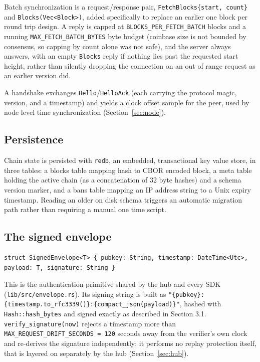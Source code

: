 \documentclass[11pt]{article}
\newcommand{\code}[1]{\texttt{#1}}
\begin{document}
Batch synchronization is a request/response pair, \code{FetchBlocks\{start, count\}} and \code{Blocks(Vec<Block>)}, added specifically to replace an earlier one block per round trip design. A reply is capped at \code{BLOCKS_PER_FETCH_BATCH} blocks and a running \code{MAX_FETCH_BATCH_BYTES} byte budget (coinbase size is not bounded by consensus, so capping by count alone was not safe), and the server always answers, with an empty \code{Blocks} reply if nothing lies past the requested start height, rather than silently dropping the connection on an out of range request as an earlier version did.

A handshake exchanges \code{Hello}/\code{HelloAck} (each carrying the protocol magic, version, and a timestamp) and yields a clock offset sample for the peer, used by node level time synchronization (Section~\ref{sec:node}).

\subsection{Persistence}

Chain state is persisted with \code{redb}, an embedded, transactional key value store, in three tables: a blocks table mapping hash to CBOR encoded block, a meta table holding the active chain (as a concatenation of 32 byte hashes) and a schema version marker, and a bans table mapping an IP address string to a Unix expiry timestamp. Reading an older on disk schema triggers an automatic migration path rather than requiring a manual one time script.

\subsection{The signed envelope}
\label{sec:envelope}

\begin{lstlisting}
struct SignedEnvelope<T> { pubkey: String, timestamp: DateTime<Utc>, payload: T, signature: String }
\end{lstlisting}

This is the authentication primitive shared by the hub and every SDK (\code{lib/src/envelope.rs}). Its signing string is built as \code{"\{pubkey\}:\{timestamp.to\_rfc3339()\}:\{compact\_json(payload)\}"}, hashed with \code{Hash::hash\_bytes} and signed exactly as described in Section 3.1. \code{verify\_signature(now)} rejects a timestamp more than \code{MAX\_REQUEST\_DRIFT\_SECONDS = 120} seconds away from the verifier's own clock and re-derives the signature independently; it performs no replay protection itself, that is layered on separately by the hub (Section~\ref{sec:hub}).
\end{document}
